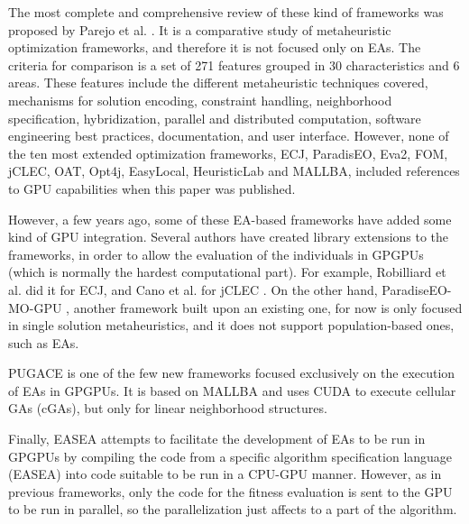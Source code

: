 \documentclass{article}
\begin{document}
The most complete and comprehensive review of these kind of frameworks was proposed by Parejo et al. \cite{springerlink:10.1007/s00500-011-0754-8}. It is a comparative study of metaheuristic optimization frameworks, and therefore it is not focused only on EAs. The criteria for comparison is a set of 271 features grouped in 30 characteristics and 6 areas. These features include the different metaheuristic techniques covered, mechanisms for solution encoding, constraint handling, neighborhood specification, hybridization, parallel and distributed computation, software engineering best practices, documentation, and user interface. However, none of the ten most extended optimization frameworks, ECJ, ParadisEO, Eva2, FOM, jCLEC, OAT, Opt4j, EasyLocal, HeuristicLab and MALLBA, included references to GPU capabilities when this paper was published.

However, a few years ago, some of these EA-based frameworks have added some
kind of GPU integration. Several authors have created library
extensions to the frameworks, in order to allow the evaluation of the
individuals in GPGPUs (which is normally the hardest computational
part). For example, Robilliard et al. \cite{RobilliardECJGPU08} did it
for ECJ, and Cano et al. for jCLEC
\cite{SpeedingTheEvaluationofGPCano:2012}.
On the other hand, ParadiseEO-MO-GPU \cite{MealbParadiseoGPU13}, another framework built upon an existing one, for now is only focused in single solution metaheuristics, and it does not support population-based ones, such as EAs.


PUGACE \cite{5586286} is one of the few new frameworks focused exclusively on the execution of EAs in GPGPUs. It is based on MALLBA and uses CUDA to execute cellular GAs (cGAs), but only for linear neighborhood structures. %

Finally, EASEA \cite{Maitre:2009:CGP:1569901.1570089} attempts to facilitate the development of EAs to be run in GPGPUs by compiling the code from a specific algorithm specification language (EASEA) into code suitable to be run in a CPU-GPU manner.
However, as in previous frameworks, only the code for the fitness
evaluation is sent to the GPU to be run in parallel, so the parallelization just affects to a part of the algorithm.
\end{document}
